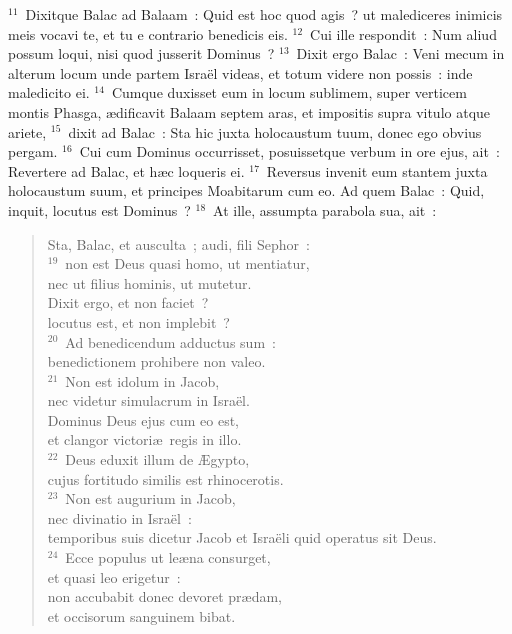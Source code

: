 ${}^{11}$~Dixitque Balac ad Balaam~: Quid est hoc quod agis~? ut malediceres inimicis meis vocavi te, et tu e contrario benedicis eis.
${}^{12}$~Cui ille respondit~: Num aliud possum loqui, nisi quod jusserit Dominus~?
${}^{13}$~Dixit ergo Balac~: Veni mecum in alterum locum unde partem Isra\"el videas, et totum videre non possis~: inde maledicito ei.
${}^{14}$~Cumque duxisset eum in locum sublimem, super verticem montis Phasga, \ae dificavit Balaam septem aras, et impositis supra vitulo atque ariete,
${}^{15}$~dixit ad Balac~: Sta hic juxta holocaustum tuum, donec ego obvius pergam.
${}^{16}$~Cui cum Dominus occurrisset, posuissetque verbum in ore ejus, ait~: Revertere ad Balac, et h\ae c loqueris ei.
${}^{17}$~Reversus invenit eum stantem juxta holocaustum suum, et principes Moabitarum cum eo. Ad quem Balac~: Quid, inquit, locutus est Dominus~?
${}^{18}$~At ille, assumpta parabola sua, ait~: \begin{verse}Sta, Balac, et ausculta~; audi, fili Sephor~:\\
${}^{19}$~non est Deus quasi homo, ut mentiatur,\\ nec ut filius hominis, ut mutetur.\\ Dixit ergo, et non faciet~?\\ locutus est, et non implebit~?\\
${}^{20}$~Ad benedicendum adductus sum~:\\ benedictionem prohibere non valeo.\\
${}^{21}$~Non est idolum in Jacob,\\ nec videtur simulacrum in Isra\"el.\\ Dominus Deus ejus cum eo est,\\ et clangor victori\ae\ regis in illo.\\
${}^{22}$~Deus eduxit illum de \AE gypto,\\ cujus fortitudo similis est rhinocerotis.\\
${}^{23}$~Non est augurium in Jacob,\\ nec divinatio in Isra\"el~:\\ temporibus suis dicetur Jacob et Isra\"eli quid operatus sit Deus.\\
${}^{24}$~Ecce populus ut le\ae na consurget,\\ et quasi leo erigetur~:\\ non accubabit donec devoret pr\ae dam,\\ et occisorum sanguinem bibat.\end{verse}


